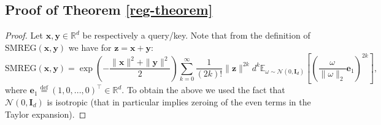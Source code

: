 \subsection{Proof of Theorem \ref{reg-theorem}}
\begin{proof}
Let $\mathbf{x}, \mathbf{y} \in \mathbb{R}^{d}$ be respectively a query/key.
Note that from the definition of $\mathrm{SMREG}(\mathbf{x}, \mathbf{y})$ we have
for $\mathbf{z} = \mathbf{x}+\mathbf{y}$:
\begin{equation}
\mathrm{SMREG}(\mathbf{x}, \mathbf{y}) = 
\exp(-\frac{\|\mathbf{x}\|^{2}+\|\mathbf{y}\|^{2}}{2})
\sum_{k=0}^{\infty}\frac{1}{(2k)!}\|\mathbf{z}\|^{2k}d^{k}\mathbb{E}_{\omega \sim \mathcal{N}(0, \mathbf{I}_{d})}[(\frac{\omega}{\|\omega\|_{2}}\mathbf{e}_{1})^{2k}],
\end{equation}
where $\mathbf{e}_{1} \overset{\mathrm{def}}{=} (1,0,...,0)^{\top} \in \mathbb{R}^{d}$. To obtain the above we used the fact that $\mathcal{N}(0, \mathbf{I}_{d})$ is isotropic (that in particular implies zeroing of the even terms in the Taylor expansion).


\end{proof}
